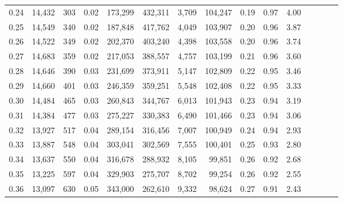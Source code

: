 \begin{tabular}{rrrcrrrrrrrrrrr}
0.24 &  14,432 &    303 &                                       0.02 &  173,299 &  432,311 &    3,709 &  104,247 &  0.19 &  0.97 &                         4.00 \\
0.25 &  14,549 &    340 &                                       0.02 &  187,848 &  417,762 &    4,049 &  103,907 &  0.20 &  0.96 &                         3.87 \\
0.26 &  14,522 &    349 &                                       0.02 &  202,370 &  403,240 &    4,398 &  103,558 &  0.20 &  0.96 &                         3.74 \\
0.27 &  14,683 &    359 &                                       0.02 &  217,053 &  388,557 &    4,757 &  103,199 &  0.21 &  0.96 &                         3.60 \\
0.28 &  14,646 &    390 &                                       0.03 &  231,699 &  373,911 &    5,147 &  102,809 &  0.22 &  0.95 &                         3.46 \\
0.29 &  14,660 &    401 &                                       0.03 &  246,359 &  359,251 &    5,548 &  102,408 &  0.22 &  0.95 &                         3.33 \\
0.30 &  14,484 &    465 &                                       0.03 &  260,843 &  344,767 &    6,013 &  101,943 &  0.23 &  0.94 &                         3.19 \\
0.31 &  14,384 &    477 &                                       0.03 &  275,227 &  330,383 &    6,490 &  101,466 &  0.23 &  0.94 &                         3.06 \\
0.32 &  13,927 &    517 &                                       0.04 &  289,154 &  316,456 &    7,007 &  100,949 &  0.24 &  0.94 &                         2.93 \\
0.33 &  13,887 &    548 &                                       0.04 &  303,041 &  302,569 &    7,555 &  100,401 &  0.25 &  0.93 &                         2.80 \\
0.34 &  13,637 &    550 &                                       0.04 &  316,678 &  288,932 &    8,105 &   99,851 &  0.26 &  0.92 &                         2.68 \\
0.35 &  13,225 &    597 &                                       0.04 &  329,903 &  275,707 &    8,702 &   99,254 &  0.26 &  0.92 &                         2.55 \\
0.36 &  13,097 &    630 &                                       0.05 &  343,000 &  262,610 &    9,332 &   98,624 &  0.27 &  0.91 &                         2.43 \\

\end{tabular}
